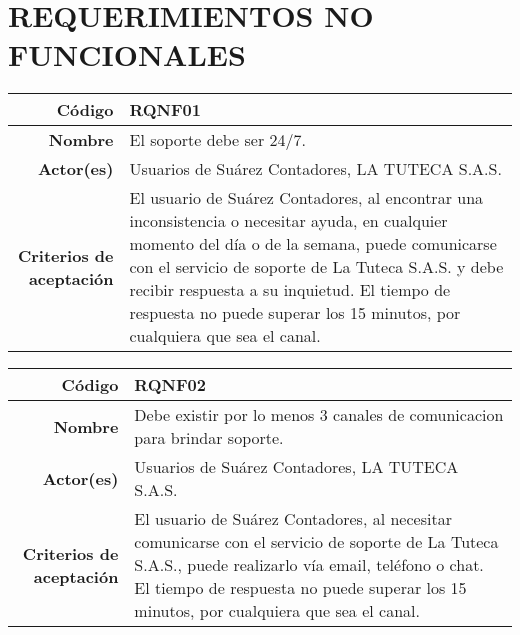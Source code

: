 \chapter{REQUERIMIENTOS NO FUNCIONALES}
%
\begin{table}[H]
	\centering
	\begin{tabular}{| r | p{10cm} |}
	\hline
	\textbf{C\'odigo} & \textbf{RQNF01} \\
	\hline
	\textbf{Nombre} & El soporte debe ser 24/7. \\
	\hline
	\textbf{Actor(es)} & Usuarios de Su\'arez Contadores, LA TUTECA S.A.S. \\
	\hline
	\textbf{Criterios de aceptaci\'on} & 
		El usuario de Su\'arez Contadores, al encontrar una inconsistencia o necesitar ayuda, en cualquier
		momento del d\'ia o de la semana, puede comunicarse con el servicio de soporte de La Tuteca S.A.S. y
		debe recibir respuesta a su inquietud. El tiempo de respuesta no puede superar los 15 minutos, por
		cualquiera que sea el canal.\\
	\hline
	\end{tabular}
\end{table}
%
\begin{table}[H]
	\centering
	\begin{tabular}{| r | p{10cm} |}
	\hline
	\textbf{C\'odigo} & \textbf{RQNF02} \\
	\hline
	\textbf{Nombre} & Debe existir por lo menos 3 canales de comunicacion para brindar soporte. \\
	\hline
	\textbf{Actor(es)} & Usuarios de Su\'arez Contadores, LA TUTECA S.A.S. \\
	\hline
	\textbf{Criterios de aceptaci\'on} & 
		El usuario de Su\'arez Contadores, al necesitar comunicarse con el servicio de soporte de 
		La Tuteca S.A.S., puede realizarlo v\'ia email, tel\'efono o chat. El tiempo de respuesta no puede 
		superar los 15 minutos, por	cualquiera que sea el canal.\\
	\hline
	\end{tabular}
\end{table}
%
